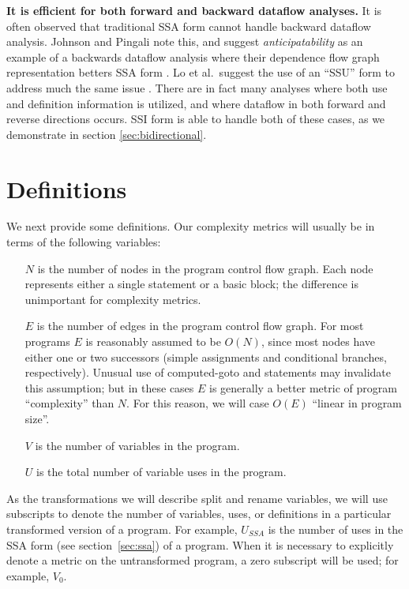 \documentclass[12pt,titlepage,twoside]{article}
\let\oldsection\section
\renewcommand{\section}{\setcounter{figure}{0}\setcounter{table}{0}\oldsection}
\begin{document}
\textbf{It is efficient for both forward and backward dataflow analyses.}
It is often observed that traditional SSA form cannot handle backward
dataflow analysis.  Johnson and Pingali note this, and suggest
\emph{anticipatability} as an example of a backwards dataflow analysis
where their dependence flow graph representation betters SSA form
\cite{johnson93:dfg}. Lo et al.\ suggest the use of an ``SSU'' form to
address much the same issue \cite{lo98:ssu}.  There are in fact many
analyses where both use and definition information is utilized, and
where dataflow in both forward and reverse directions occurs.  SSI
form is able to handle both of these cases, as we demonstrate in
section \ref{sec:bidirectional}.

\section{Definitions}\label{sec:defs}
We next provide some definitions.
Our complexity metrics will usually be in terms of the following
variables:
\begin{itemize}
\item[$N$] is the number of nodes in the program control flow graph.
Each node represents either a single statement or a basic block; the
difference is unimportant for complexity metrics.
\item[$E$] is the number of edges in the program control flow graph.
For most programs $E$ is reasonably assumed to be $O(N)$, since most
nodes have either one or two successors (simple assignments and
conditional branches, respectively).  Unusual use of computed-goto and
 statements may invalidate this assumption; but in these
cases $E$ is generally a better metric of program ``complexity'' than
$N$.  For this reason, we will case $O(E)$ ``linear in program size''.
\item[$V$] is the number of variables in the program.
\item[$U$] is the total number of variable uses in the program.
\end{itemize}
As the transformations we will describe split and rename variables, we
will use subscripts to denote the number of variables, uses, or
definitions in a particular transformed version of a program.  For
example, $U_{SSA}$ is the number of uses in the SSA form (see
section~\ref{sec:ssa}) of a program.  When it is necessary to
explicitly denote a metric on the untransformed program, a zero
subscript will be used; for example, $V_0$.
\end{document}
